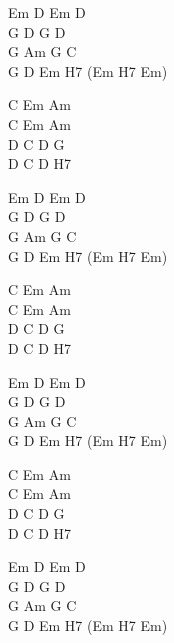 \begin{chord}
Em D Em D\\
G D G D\\
G Am G C\\
G D Em H7 (Em H7 Em)

C Em Am\\
C Em Am\\
D C D G\\
D C D H7

Em D Em D\\
G D G D\\
G Am G C\\
G D Em H7 (Em H7 Em)

C Em Am\\
C Em Am\\
D C D G\\
D C D H7

Em D Em D\\
G D G D\\
G Am G C\\
G D Em H7 (Em H7 Em)

C Em Am\\
C Em Am\\
D C D G\\
D C D H7

Em D Em D\\
G D G D\\
G Am G C\\
G D Em H7 (Em H7 Em)
\end{chord}
